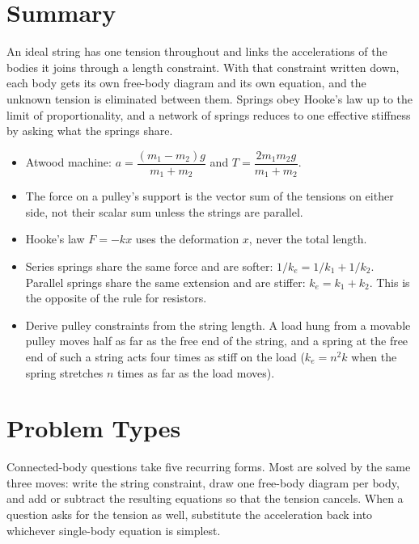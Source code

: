 \section{Summary}\label{sec:summary8}
An ideal string has one tension throughout and links the accelerations of the bodies it joins through a
length constraint. With that constraint written down, each body gets its own free-body diagram and its own
equation, and the unknown tension is eliminated between them. Springs obey Hooke's law up to the limit of
proportionality, and a network of springs reduces to one effective stiffness by asking what the springs share.

\begin{itemize}
\item Atwood machine: $a=\dfrac{(m_1-m_2)g}{m_1+m_2}$ and $T=\dfrac{2m_1m_2g}{m_1+m_2}$.
\item The force on a pulley's support is the vector sum of the tensions on either side, not their scalar sum
      unless the strings are parallel.
\item Hooke's law $F=-kx$ uses the deformation $x$, never the total length.
\item Series springs share the same force and are softer: $1/k_e=1/k_1+1/k_2$. Parallel springs share the same
      extension and are stiffer: $k_e=k_1+k_2$. This is the opposite of the rule for resistors.
\item Derive pulley constraints from the string length. A load hung from a movable pulley moves half as far
      as the free end of the string, and a spring at the free end of such a string acts four times as
      stiff on the load ($k_e=n^2k$ when the spring stretches $n$ times as far as the load moves).
\end{itemize}

\section{Problem Types}\label{sec:types8}
Connected-body questions take five recurring forms. Most are solved by the same three moves: write the
string constraint, draw one free-body diagram per body, and add or subtract the resulting equations so that
the tension cancels. When a question asks for the tension as well, substitute the acceleration back into
whichever single-body equation is simplest.

